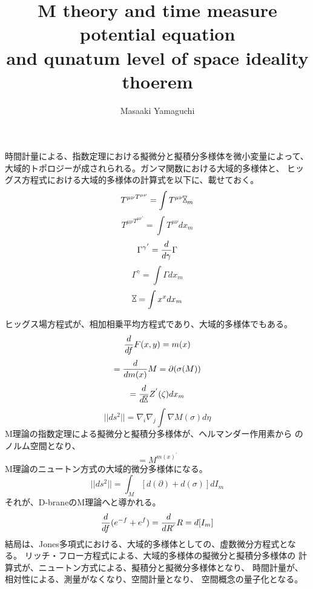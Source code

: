 \documentclass{jsarticle}
\begin{document}
\title{M theory and time measure potential equation \\
and qunatum level of space ideality thoerem}
\author{Masaaki Yamaguchi}
\date{}
\maketitle
\newcommand{\timebow}{%
	\begin{picture}(5,5)
		\put(0,0){$\text{\rotatebox{90}{$\bowtie$}}$}
	\end{picture} %
	}
   \newcommand{\variint}{%
	\begin{picture}(15,30)
		\put(0,0){
			$ \iint $}
		\put(0,5){\line(15,0){15}}
	\end{picture} %
}

\newcommand{\variiint}{%
	\begin{picture}(15,15)
		\put(0,0){
			$ \iiint $}
		\put(0,5){\line(15,0){20}}
	\end{picture} %
}



 \newcommand{\alearletter}{%
	 \begin{picture}(10,20)
		 \put(0,0){
			 $ \square $}
		 \put(0,0){\line(1,1){10}}
	 \end{picture} %
	 }


       時間計量による、指数定理における擬微分と擬積分多様体を微小変量によって、
   大域的トポロジーが成されられる。ガンマ関数における大域的多様体と、
   ヒッグス方程式における大域的多様体の計算式を以下に、載せておく。
   $$ {T^{\mu\nu}}^{T^{\mu\nu}} = \int T^{\mu\nu} \rotatebox{90}{$\bowtie$}_m $$
   $$   {T^{\mu\nu}}^{{T^{\mu\nu}}^{'}}=\int T^{\mu\nu}dx_m  $$
      $$ {\Gamma^{\gamma}}^{'} = {d \over {d \gamma}}\Gamma $$
   $$ \Gamma^{\gamma} = \int \Gamma dx_m $$
   $$ \rotatebox{90}{$\bowtie$} = \int x^x dx_m $$


     ヒッグス場方程式が、相加相乗平均方程式であり、大域的多様体でもある。
  $$ {d \over {df}}F(x,y)=m(x) $$
  $$ = {d \over {d m(x)}}M = \partial (\sigma(M)) $$
  $$=  {d \over {d \timebow}}Z^{'}(\zeta)dx_m $$
  $$ ||ds^2|| = \nabla_{i}\nabla_{j}\int \nabla M(\sigma)d\eta $$
  M理論の指数定理による擬微分と擬積分多様体が、ヘルマンダー作用素から
  のノルム空間となり、
  $$ = M^{{m(x)^{'}}} $$
  M理論のニュートン方式の大域的微分多様体になる。
  $$ ||ds^2|| = \int_M [d(\partial) + d(\sigma)]dI_m $$
  それが、D-braneのM理論へと導かれる。
  $$ {d \over {df}}(e^{-f} + e^{f}) = {{d \over {d R^{'}}}}R = d[I_m] $$
  結局は、Jones多項式における、大域的多様体としての、虚数微分方程式となる。
  リッチ・フロー方程式による、大域的多様体の擬微分と擬積分多様体の
  計算式が、ニュートン方式による、擬積分と擬微分多様体となり、
  時間計量が、相対性による、測量がなくなり、空間計量となり、
  空間概念の量子化となる。
\end{document}
